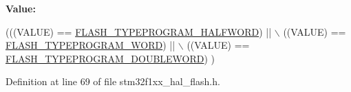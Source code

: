 {\bfseries Value\+:}
\begin{DoxyCode}
(((VALUE) == \hyperlink{group___f_l_a_s_h___type___program_ga2b607dfc2efd463a8530e327bc755582}{FLASH\_TYPEPROGRAM\_HALFWORD}) || \(\backslash\)
                                      ((VALUE) == \hyperlink{group___f_l_a_s_h___type___program_gadd25c6821539030ba6711e7c0d586c3e}{FLASH\_TYPEPROGRAM\_WORD})     || \(\backslash\)
                                      ((VALUE) == \hyperlink{group___f_l_a_s_h___type___program_gabdc2b0b4d2e66c2be90fafbfbf1e225f}{FLASH\_TYPEPROGRAM\_DOUBLEWORD})
      )
\end{DoxyCode}


Definition at line 69 of file stm32f1xx\+\_\+hal\+\_\+flash.\+h.

